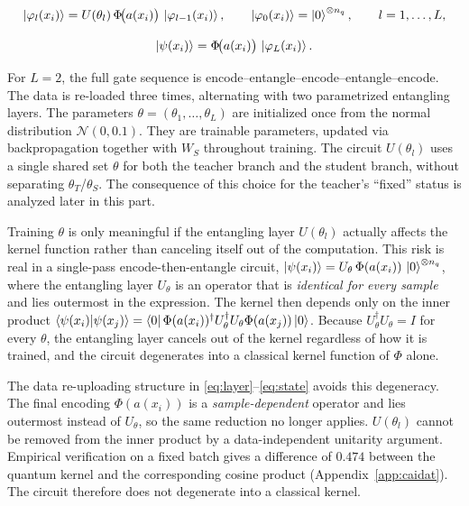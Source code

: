 \begin{equation}
\label{eq:layer}
\ket{\varphi_l(x_i)} = U(\theta_l)\,\Phi\!\big(a(x_i)\big)\,\ket{\varphi_{l-1}(x_i)},
\qquad
\ket{\varphi_0(x_i)} = \ket{0}^{\otimes n_q},
\qquad l = 1,\ldots,L,
\end{equation}

\begin{equation}
\label{eq:state}
\ket{\psi(x_i)} = \Phi\!\big(a(x_i)\big)\,\ket{\varphi_L(x_i)}.
\end{equation}

For $L=2$, the full gate sequence is encode--entangle--encode--entangle--encode.
The data is re-loaded three times, alternating with two parametrized
entangling layers. The parameters $\theta = (\theta_1,\ldots,\theta_L)$
are initialized once from the normal distribution $\mathcal{N}(0, 0.1)$.
They are trainable parameters, updated via backpropagation
together with $W_S$ throughout training. The circuit $U(\theta_l)$
uses a single shared set $\theta$ for both the teacher
branch and the student branch, without separating $\theta_T$/$\theta_S$.
The consequence of this choice for the teacher's ``fixed'' status is
analyzed later in this part.

Training $\theta$ is only meaningful if the entangling layer
$U(\theta_l)$ actually affects the kernel function rather than
canceling itself out of the computation. This risk is real in a
single-pass encode-then-entangle circuit,
$\ket{\psi(x_i)} = U_\theta\,\Phi(a(x_i))\,\ket{0}^{\otimes n_q}$,
where the entangling layer $U_\theta$ is an operator that is
\emph{identical for every sample} and lies outermost in the
expression. The kernel then depends only on the inner product
$\braket{\psi(x_i)|\psi(x_j)} = \bra{0}\Phi(a(x_i))^\dagger U_\theta^\dagger U_\theta \Phi(a(x_j))\ket{0}$. Because $U_\theta^\dagger U_\theta = I$ for every $\theta$, the entangling layer cancels out of the kernel regardless of how it is trained, and the circuit degenerates into a classical kernel function of $\Phi$ alone.

The data re-uploading structure in \eqref{eq:layer}--\eqref{eq:state}
avoids this degeneracy. The final encoding $\Phi(a(x_i))$ is a
\emph{sample-dependent} operator and lies outermost instead of
$U_\theta$, so the same reduction no longer applies. $U(\theta_l)$
cannot be removed from the inner product by a data-independent
unitarity argument. Empirical verification on a fixed batch gives a difference of $0.474$ between the quantum kernel and the corresponding cosine product (Appendix~\ref{app:caidat}). The circuit therefore does not degenerate into a classical kernel.

